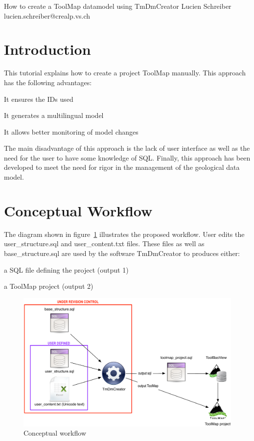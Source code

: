 \documentclass[a4paper, 12pt]{article}
\begin{document}
 {How to create a ToolMap datamodel using TmDmCreator} {Lucien Schreiber} {lucien.schreiber@crealp.vs.ch}
\tableofcontents
\pagebreak

\section{Introduction}
This tutorial explains how to create a project ToolMap manually. This approach has the following advantages:
\begin{enumerate*}
  \item It ensures the IDs used
  \item It generates a multilingual model
  \item It allows better monitoring of model changes
\end{enumerate*}
The main disadvantage of this approach is the lack of user interface as well as the need for the user to have some knowledge of SQL. Finally, this approach has been developed to meet the need for rigor in the management of the geological data model.


\section{Conceptual Workflow}
The diagram shown in figure~\ref{fig:conceptual-workflow} illustrates the proposed workflow. User edits the user\_structure.sql and user\_content.txt files. These files as well as base\_structure.sql are used by the software TmDmCreator to produces either:
\begin{enumerate*}
  \item	a SQL file defining the project (output 1)
  \item	a ToolMap project (output 2)
\end{enumerate*}

\begin{figure} [htbp]
	\centering
    \includegraphics[width=1\textwidth]{img/workflow.pdf}
    \caption{Conceptual workflow}
    \label{fig:conceptual-workflow}
\end{figure}
\end{document}
